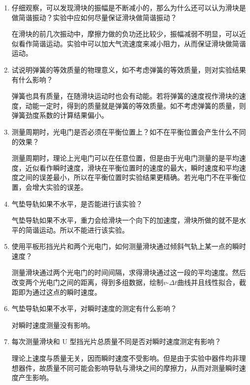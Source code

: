 \documentclass[11pt]{article}
\begin{document}
\begin{enumerate}
    \item 仔细观察，可以发现滑块的振幅是不断减小的，那么为什么还可以认为滑块是做简谐振动？实验中应如何尽量保证滑块做简谐振动？
    
    在滑块的前几次振动中，摩擦力做的负功还比较少，振幅减弱不明显，可以近似看作简谐运动。实验中可以加大气流速度来减小阻力，从而保证滑块做简谐运动。
    
    \item 试说明弹簧的等效质量的物理意义，如不考虑弹簧的等效质量，则对实验结果有什么影响？
    
    弹簧也具有质量，在随滑块运动时也会有动能。若将弹簧的速度视作滑块的速度，动能一定时，得到的质量就是弹簧的等效质量。如不考虑弹簧的质量，则弹簧劲度系数的计算结果偏小。
    
    \item 测量周期时，光电门是否必须在平衡位置上？如不在平衡位置会产生什么不同的效果？
    
    测量周期时，理论上光电门可以在任意位置，但是由于光电门测量的是平均速度，近似看作瞬时速度，滑块在平衡位置时的速度的最大，瞬时速度和平均速度之间的误差最小，所以在平衡位置时实验结果更精确。若光电门不在平衡位置，会增大实验的误差。
    
    \item 气垫导轨如果不水平，是否能进行该实验？
    
    气垫导轨如果不水平，重力会给滑块一个向下的加速度，滑块所做的就不是水平的简谐运动。所以不能进行该实验。
    
    \item 使用平板形挡光片和两个光电门，如何测量滑块通过倾斜气轨上某一点的瞬时速度？
    
    测量滑块通过两个光电门的时间间隔，求得滑块通过这一段的平均速度。然后改变两个光电门之间的距离，得到多组数据，绘制$v$-$\Delta t$曲线并且线性拟合，截距即为通过这点的瞬时速度。
    
    \item 气垫导轨如果不水平，对瞬时速度的测定有什么影响？
    
    对瞬时速度测量没有影响。
    
    \item 每次测量滑块和 U 型挡光片总质量不同是否对瞬时速度测定有影响？
    
    理论上速度与质量无关，因而瞬时速度不受影响。但是由于实验中器件均非理想器件，故质量不同可能会影响导轨与滑块之间的摩擦力，从而对测量瞬时速度产生影响。

\end{enumerate}
\end{document}
